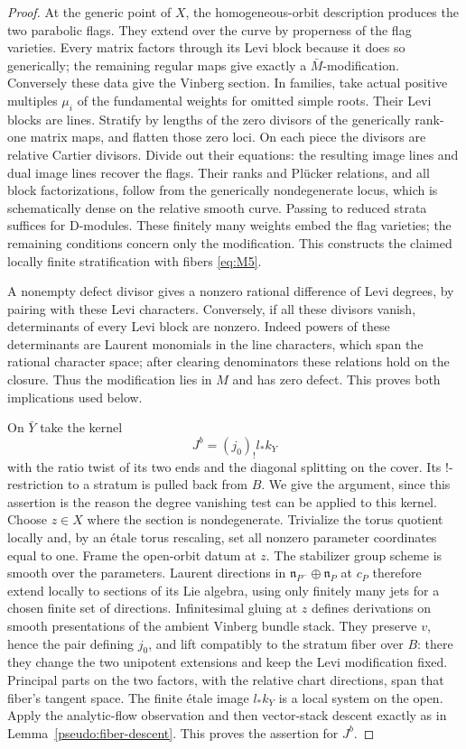 \begin{proof}
At the generic point of $X$, the homogeneous-orbit description produces
the two parabolic flags.  They extend over the curve by properness of the
flag varieties.  Every matrix factors through its Levi block because it
does so generically; the remaining regular maps give exactly a
$\bar M$-modification.  Conversely these data give the Vinberg section.
In families, take actual positive multiples $\mu_i$ of the fundamental
weights for omitted simple roots.  Their Levi blocks are lines.  Stratify
by lengths of the zero divisors of the generically rank-one matrix maps,
and flatten those zero loci.  On each piece the divisors are relative
Cartier divisors.  Divide out their equations: the resulting image lines
and dual image lines recover the flags.  Their ranks and Pl\"ucker
relations, and all block factorizations, follow from the generically
nondegenerate locus, which is schematically dense on the relative smooth
curve.  Passing to reduced strata suffices for D-modules.  These finitely
many weights embed the flag varieties; the remaining conditions concern
only the modification.  This constructs the claimed locally finite
stratification with fibers \eqref{eq:M5}.

A nonempty defect divisor gives a nonzero rational difference of Levi
degrees, by pairing with these Levi characters.  Conversely, if all these
divisors vanish, determinants of every Levi block are nonzero.  Indeed
powers of these determinants are Laurent monomials in the line characters,
which span the rational character space; after clearing denominators these
relations hold on the closure.  Thus the modification lies in $M$ and has
zero defect.  This proves both implications used below.

On $\bar Y$ take the kernel
\[
 J^b=(j_0)_!l_*k_Y
\]
with the ratio twist of its two ends and the diagonal splitting on the
cover.  Its !-restriction to a stratum is pulled back from $B$.  We give the
argument, since this assertion is the reason the degree vanishing test can
be applied to this kernel.  Choose $z\in X$ where the section is
nondegenerate.  Trivialize the torus quotient locally and, by an \'{e}tale
torus rescaling, set all nonzero parameter coordinates equal to one.
Frame the open-orbit datum at $z$.  The stabilizer group scheme is smooth
over the parameters.  Laurent directions in
$\mathfrak n_{P^-}\oplus\mathfrak n_P$ at $c_P$ therefore extend locally to
sections of its Lie algebra, using only finitely many jets for a chosen
finite set of directions.  Infinitesimal gluing at $z$ defines derivations
on smooth presentations of the ambient Vinberg bundle stack.  They
preserve $v$, hence the pair defining $j_0$, and lift compatibly to the
stratum fiber over $B$: there they change the two unipotent extensions and
keep the Levi modification fixed.  Principal parts on the two factors,
with the relative chart directions, span that fiber's tangent space.
The finite \'{e}tale image $l_*k_Y$ is a local system on the open.  Apply
the analytic-flow observation and then vector-stack descent exactly as in
Lemma~\ref{pseudo:fiber-descent}.  This proves the assertion for $J^b$.


\end{proof}
